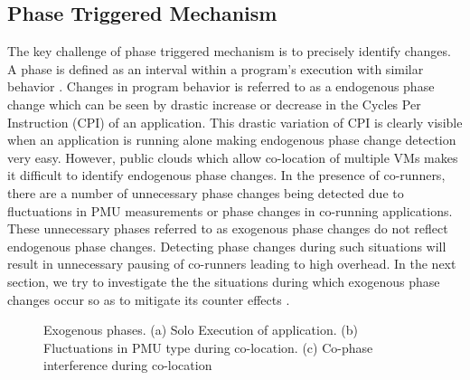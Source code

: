 \documentclass{sig-alternate}
\begin{document}
\subsection{Phase Triggered Mechanism}
\label{subsec:PhaseTriggeredMechanism}

The key challenge of phase triggered mechanism is to precisely identify changes. A phase is defined as an interval within a program's execution with similar behavior \cite{DBLP:journals/jilp/HamerlyPLC05}. Changes in program behavior is referred to as a endogenous phase change which can be seen by drastic increase or decrease in the Cycles Per Instruction (CPI) of an application. This drastic variation of CPI is clearly visible when an application is running alone making endogenous phase change detection very easy. However, public clouds which allow co-location of multiple VMs makes it difficult to identify endogenous phase changes. In the presence of co-runners, there are a number of unnecessary phase changes being detected due to fluctuations in PMU measurements or phase changes in co-running applications. These unnecessary phases referred to as exogenous phase changes do not reflect endogenous phase changes. Detecting phase changes during such situations will result in unnecessary pausing of co-runners leading to high overhead. In the next section, we try to investigate the the situations during which exogenous phase changes occur so as to mitigate its counter effects .

\begin{figure}
\centering
\begin{minipage}[t]{1\columnwidth}
\centering
{}
\caption{Exogenous phases. (a) Solo Execution of application. (b) Fluctuations in PMU type during co-location. (c) Co-phase interference during co-location\vspace{-0.3in}}
\label{fig:type1}
\end{minipage}
\end{figure}
\end{document}
